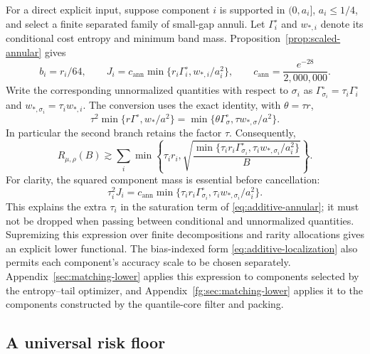For a direct explicit input, suppose component $i$ is supported in
$(0,a_i]$, $a_i\le1/4$, and select a finite separated family of small-gap
annuli. Let $\Gamma_i^{\circ}$ and $w_{*,i}$ denote its conditional cost entropy
and minimum band mass. Proposition~\ref{prop:scaled-annular} gives
\[
 b_i=r_i/64,\qquad
 J_i=c_{\mathrm{ann}}
       \min\{r_i\Gamma_i^{\circ},w_{*,i}/a_i^2\},\qquad
 c_{\mathrm{ann}}=\frac{e^{-28}}{2{,}000{,}000}.
\]
Write the corresponding unnormalized quantities with respect to
$\sigma_i$ as $\Gamma_{\sigma_i}^{\circ}=\tau_i\Gamma_i^{\circ}$ and
$w_{*,\sigma_i}=\tau_iw_{*,i}$. The conversion uses the exact identity, with $\theta=\tau r$,
\[
 \tau^2\min\{r\Gamma^{\circ},w_*/a^2\}
 =\min\{\theta\Gamma_{\sigma}^{\circ},\tau w_{*,\sigma}/a^2\}.
\]
In particular the second branch retains the factor $\tau$. Consequently,
\begin{equation}\label{eq:additive-annular}
 R_{\mu,\rho}(B)\gtrsim
 \sum_i\min\left\{\tau_i r_i,
 \sqrt{\frac{
 \min\{\tau_i r_i\Gamma_{\sigma_i}^{\circ},
           \tau_iw_{*,\sigma_i}/a_i^2\}}B}\right\}.
\end{equation}
For clarity, the squared component mass is essential before cancellation:
\[
 \tau_i^2J_i=c_{\mathrm{ann}}
 \min\{\tau_i r_i\Gamma_{\sigma_i}^{\circ},
             \tau_iw_{*,\sigma_i}/a_i^2\}.
\]
This explains the extra $\tau_i$ in the saturation term of
\eqref{eq:additive-annular}; it must not be dropped when passing between
conditional and unnormalized quantities.
Supremizing this expression over finite decompositions and rarity
allocations gives an explicit lower functional. The bias-indexed form
\eqref{eq:additive-localization} also permits each component's accuracy
scale to be chosen separately. Appendix~\ref{sec:matching-lower} applies this expression to components
selected by the entropy--tail optimizer, and Appendix~\ref{fg:sec:matching-lower}
applies it to the components constructed by the quantile-core filter and
packing.


\subsection{A universal risk floor}


